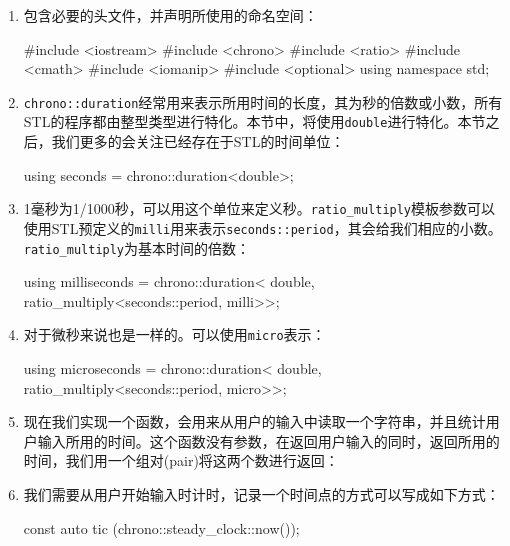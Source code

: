 \begin{enumerate}
\item 包含必要的头文件，并声明所使用的命名空间：

\begin{codebox}[cpp]
#include <iostream>
#include <chrono>
#include <ratio>
#include <cmath>
#include <iomanip>
#include <optional>
using namespace std; 
\end{codebox}

\item \texttt{chrono::duration}经常用来表示所用时间的长度，其为秒的倍数或小数，所有STL的程序都由整型类型进行特化。本节中，将使用\texttt{double}进行特化。本节之后，我们更多的会关注已经存在于STL的时间单位：

\begin{codebox}[cpp]
using seconds = chrono::duration<double>;
\end{codebox}

\item 1毫秒为1/1000秒，可以用这个单位来定义秒。\texttt{ratio\_multiply}模板参数可以使用STL预定义的\texttt{milli}用来表示\texttt{seconds::period}，其会给我们相应的小数。\texttt{ratio\_multiply}为基本时间的倍数：

\begin{codebox}[cpp]
using milliseconds = chrono::duration<
    double, ratio_multiply<seconds::period, milli>>;
\end{codebox}

\item 对于微秒来说也是一样的。可以使用\texttt{micro}表示：

\begin{codebox}[cpp]
using microseconds = chrono::duration<
    double, ratio_multiply<seconds::period, micro>>;
\end{codebox}

\item 现在我们实现一个函数，会用来从用户的输入中读取一个字符串，并且统计用户输入所用的时间。这个函数没有参数，在返回用户输入的同时，返回所用的时间，我们用一个组对(pair)将这两个数进行返回：

\begin{codebox}[cpp]
static pair<string, seconds> get_input()
{
    string s;
\end{codebox}

\item 我们需要从用户开始输入时计时，记录一个时间点的方式可以写成如下方式：

\begin{codebox}[cpp]
    const auto tic (chrono::steady_clock::now());
\end{codebox}


\end{enumerate}
